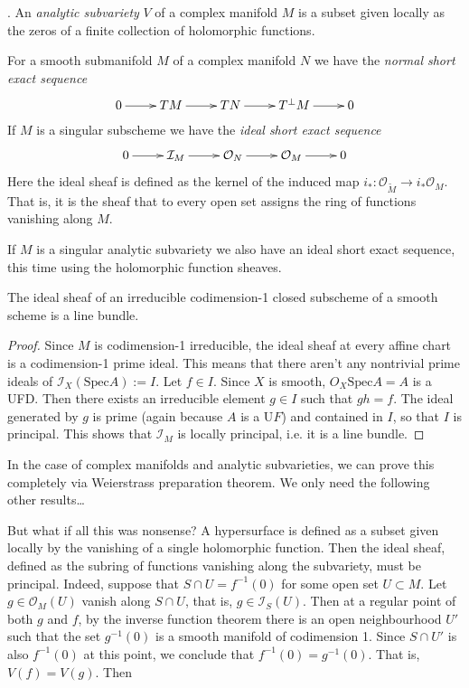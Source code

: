 \begin{definition}
\label{definition-analytic-subvariety}
\cite{gri}. An {\it analytic subvariety} $V$ of a complex manifold $M$ is a
subset given locally as the zeros of a finite collection of holomorphic
functions.
\end{definition}

For a smooth submanifold $M$ of a complex manifold $N$ we have the {\it normal 
short exact sequence}
$$
\xymatrix{
0\ar[r]&TM\ar[r]&TN\ar[r]&T^\perp M\ar[r]&0
}
$$
If $M$ is a singular subscheme we have the {\it ideal short exact sequence}
$$
\xymatrix{
0\ar[r]&\mathcal{I}_M\ar[r]&\mathcal{O}_N\ar[r]&\mathcal{O}_M\ar[r]&0
}
$$
Here the ideal sheaf is defined as the kernel of the induced map 
$i_*:\mathcal{O}_{\widetilde{M}} \to i_*\mathcal{O}_M$. That is, it is the sheaf
that to every open set assigns the ring of functions vanishing along $M$.

If $M$ is a singular analytic subvariety we also have an ideal short exact
sequence, this time using the holomorphic function sheaves.

\begin{lemma}
\label{lemma-ideal-sheaf-is-line-bundle-schemes}
The ideal sheaf of an irreducible codimension-1 closed subscheme of a smooth
scheme is a line bundle.
\end{lemma}

\begin{proof}
Since $M$ is codimension-1 irreducible, the ideal sheaf at every affine chart is
a codimension-1 prime ideal. This means that there aren't any nontrivial prime
ideals of $\mathcal{I}_X(\text{Spec}A):=I$. Let $f\in I$.
Since $X$ is smooth, $O_X\text{Spec}A=A$ is a UFD. Then there exists an
irreducible element $g\in I$ such that $gh=f$. The ideal generated by $g$ is
prime (again because $A$ is a U$F$) 
and contained in $I$, so that $I$ is principal. This shows that
$\mathcal{I}_M$ is locally principal, i.e. it is a line bundle.
\end{proof}

In the case of complex manifolds and analytic subvarieties, we can prove this
completely via Weierstrass preparation theorem. We only need the following other
results…

But what if all this was nonsense? A hypersurface is defined as a subset given
locally by the vanishing of a single holomorphic function. Then the ideal sheaf,
defined as the subring of functions vanishing along the subvariety, must be
principal. Indeed, suppose that $S \cap U=f^{-1}(0)$ for some open set 
$U \subset M$. Let $g \in \mathcal{O}_M(U)$ vanish along $S \cap U$, that is, 
$g \in \mathcal{I}_S(U)$. 
Then at a regular point of both $g$ and $f$, 
by the inverse function theorem there is an open neighbourhood $U'$ such that 
the set $g^{-1}(0)$ is a smooth manifold of codimension 1. 
Since $S \cap U'$ is also $f^{-1}(0)$ at this point, we conclude that 
$f^{-1}(0)=g^{-1}(0)$. That is, $V(f)=V(g)$. Then 

